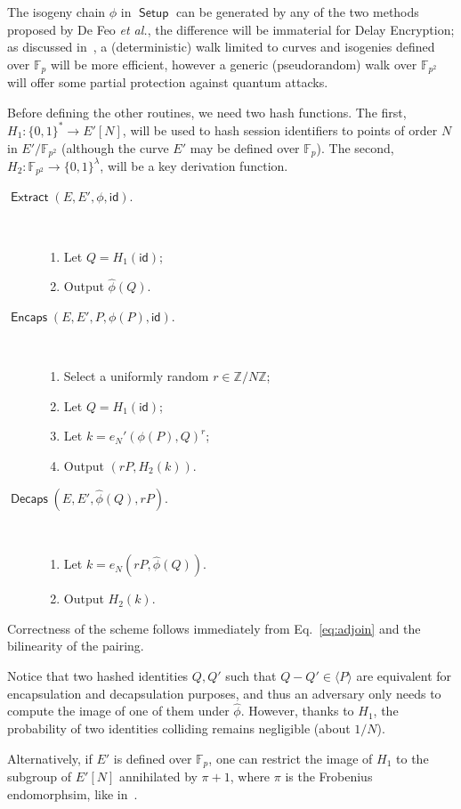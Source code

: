 \documentclass{llncs}
\newcommand{\Z}{\mathbb{Z}}
\newcommand{\F}{\mathbb{F}}
\DeclareMathOperator{\Setup}{\mathsf{Setup}}
\DeclareMathOperator{\Extract}{\mathsf{Extract}}
\DeclareMathOperator{\Encaps}{\mathsf{Encaps}}
\DeclareMathOperator{\Decaps}{\mathsf{Decaps}}
\newcommand{\id}{\mathsf{id}}
\begin{document}
The isogeny chain $\phi$ in $\Setup$ can be generated by any of the
two methods proposed by De Feo \emph{et al.}, the difference will be
immaterial for Delay Encryption; as discussed
in~\cite{10.1007/978-3-030-34578-5_10}, a (deterministic) walk limited
to curves and isogenies defined over $\F_p$ will be more efficient,
however a generic (pseudorandom) walk over $\F_{p^2}$ will offer some
partial protection against quantum attacks.

Before defining the other routines, we need two hash functions. %
The first, $H_1:\{0,1\}^*\to E'[N]$, will be used to hash session
identifiers to points of order $N$ in $E'/\F_{p^2}$ (although the
curve $E'$ may be defined over $\F_p$). %
The second, $H_2:\F_{p^2}\to\{0,1\}^\lambda$, will be a key derivation
function. %

\begin{description}
\item[$\Extract(E,E',\phi,\id)$.]\
  \begin{enumerate}
  \item Let $Q = H_1(\id)$;
  \item Output $\hat\phi(Q)$.
  \end{enumerate}
\item[$\Encaps(E,E',P,\phi(P),\id)$.]\
  \begin{enumerate}
  \item Select a uniformly random $r\in\Z/N\Z$;
  \item Let $Q = H_1(\id)$;
  \item Let $k=e_N'(\phi(P),Q)^r$;
  \item Output $(rP,H_2(k))$.
  \end{enumerate}
\item[$\Decaps(E,E',\hat\phi(Q),rP)$.]\
  \begin{enumerate}
  \item Let $k = e_N(rP,\hat\phi(Q))$.
  \item Output $H_2(k)$.
  \end{enumerate}
\end{description}

Correctness of the scheme follows immediately from
Eq.~\eqref{eq:adjoin} and the bilinearity of the pairing. %

\begin{remark}
  Notice that two hashed identities $Q,Q'$ such that
  $Q-Q'\in \langle P\rangle$ are equivalent for encapsulation and
  decapsulation purposes, and thus an adversary only needs to compute
  the image of one of them under $\hat\phi$. %
  However, thanks to $H_1$, the probability of two identities
  colliding remains negligible (about $1/N$).
  
  Alternatively, if $E'$ is defined over $\F_p$, one can restrict the
  image of $H_1$ to the subgroup of $E'[N]$ annihilated by $\pi+1$,
  where $\pi$ is the Frobenius endomorphsim, like
  in~\cite{10.1007/978-3-030-34578-5_10}.
\end{remark}
\end{document}

